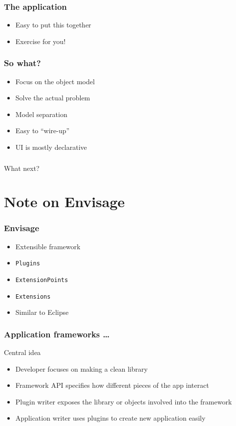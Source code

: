 \documentclass[14pt,compress]{beamer}
\newcommand{\typ}[1]{\lstinline{#1}}
\begin{document}
\begin{frame}
  \frametitle{The application}
  \begin{itemize}
      \item Easy to put this together
      \item Exercise for you!
 \end{itemize}
\end{frame}

\begin{frame}
  \frametitle{So what?}
  \begin{itemize}
      \item Focus on the object model
      \item Solve the actual problem
      \item Model separation
      \item Easy to ``wire-up''
      \item UI is mostly declarative
 \end{itemize}
\end{frame}


\begin{frame}[plain]
  \frametitle{}
  \begin{center}
      What next?
  \end{center}
\end{frame}


\section{Note on Envisage}

\begin{frame}
  \frametitle{Envisage}
  \begin{itemize}
      \item Extensible framework
      \item \typ{Plugins}
      \item \typ{ExtensionPoints}
      \item \typ{Extensions}
      \item Similar to Eclipse
 \end{itemize}
\end{frame}

\begin{frame}[fragile]
  \frametitle{Application frameworks \ldots}
  \begin{block}{Central idea}
    \begin{itemize}
    \item Developer focuses on making a clean library
    \item Framework API specifies how different pieces of the app
      interact
    \item Plugin writer exposes the library or objects involved into
      the framework
    \item Application writer uses plugins to create new application
      easily
    \end{itemize}
  \end{block}
\end{frame}
\end{document}
